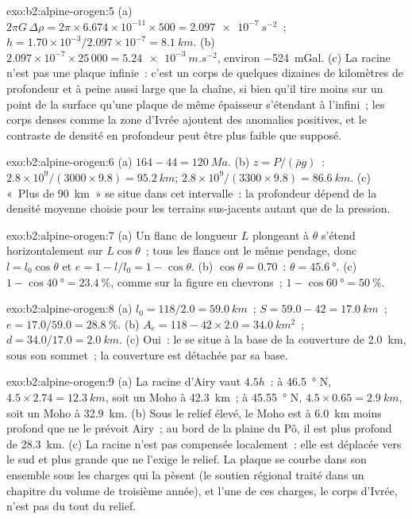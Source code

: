 \begin{solution}{exo:b2:alpine-orogen:5}
(a) $2\pi G\,\Delta\rho = 2\pi\times6.674\times10^{-11}\times500 =
\qty{2.097e-7}{s^{-2}}$~; $h = 1.70\times10^{-3}/2.097\times10^{-7} = \qty{8.1}{km}$.
(b) $2.097\times10^{-7}\times25\,000 = \qty{5.24e-3}{m.s^{-2}}$, environ
\qty{-524}{mGal}. (c) La racine n'est pas une plaque infinie~: c'est un corps de quelques dizaines de kilomètres
de profondeur et à peine aussi large que la chaîne, si bien qu'il tire moins sur un point de la surface qu'une
plaque de même épaisseur s'étendant à l'infini~; les corps denses comme la zone d'Ivrée ajoutent des
anomalies positives, et le contraste de densité en profondeur peut être plus faible que supposé.
\end{solution}

\begin{solution}{exo:b2:alpine-orogen:6}
(a) $164 - 44 = \qty{120}{Ma}$. (b) $z = P/(\bar\rho g)$~:
$2.8\times10^9/(3000\times9.8) = \qty{95.2}{km}$; $2.8\times10^9/(3300\times9.8) =
\qty{86.6}{km}$. (c) «~Plus de \qty{90}{km}~» se situe dans cet intervalle~: la profondeur dépend de
la densité moyenne choisie pour les terrains sus-jacents autant que de la pression.
\end{solution}

\begin{solution}{exo:b2:alpine-orogen:7}
(a) Un flanc de longueur $L$ plongeant à $\theta$ s'étend horizontalement sur $L\cos\theta$~; tous les flancs
ont le même pendage, donc $l = l_0\cos\theta$ et $e = 1 - l/l_0 = 1 - \cos\theta$.
(b) $\cos\theta = 0.70$~: $\theta = \qty{45.6}{\degree}$. (c) $1 - \cos\qty{40}{\degree} =
\qty{23.4}{\percent}$, comme sur la figure en chevrons~; $1 - \cos\qty{60}{\degree}
= \qty{50}{\percent}$.
\end{solution}

\begin{solution}{exo:b2:alpine-orogen:8}
(a) $l_0 = 118/2.0 = \qty{59.0}{km}$~; $S = 59.0 - 42 = \qty{17.0}{km}$~; $e = 17.0/59.0 =
\qty{28.8}{\percent}$. (b) $A_e = 118 - 42\times2.0 = \qty{34.0}{km^2}$~; $d = 34.0/17.0 =
\qty{2.0}{km}$. (c) Oui~: le  se situe à la base de la couverture de \qty{2.0}{km}, sous
son sommet~; la couverture est détachée par sa base.
\end{solution}

\begin{solution}{exo:b2:alpine-orogen:9}
(a) La racine d'Airy vaut $4.5h$~: à \qty{46.5}{\degree} N, $4.5\times2.74 = \qty{12.3}{km}$, soit un
Moho à \qty{42.3}{km}~; à \qty{45.55}{\degree} N, $4.5\times0.65 = \qty{2.9}{km}$, soit un Moho
à \qty{32.9}{km}. (b) Sous le relief élevé, le Moho est à \qty{6.0}{km} moins profond que ne le prévoit
Airy~; au bord de la plaine du Pô, il est plus profond de \qty{28.3}{km}. (c) La racine n'est pas
compensée localement~: elle est déplacée vers le sud et plus grande que ne l'exige le relief.
La plaque se courbe dans son ensemble sous les charges qui la pèsent (le soutien régional traité dans un chapitre du volume de troisième
année), et l'une de ces charges, le corps d'Ivrée, n'est pas du tout du relief.
\end{solution}

